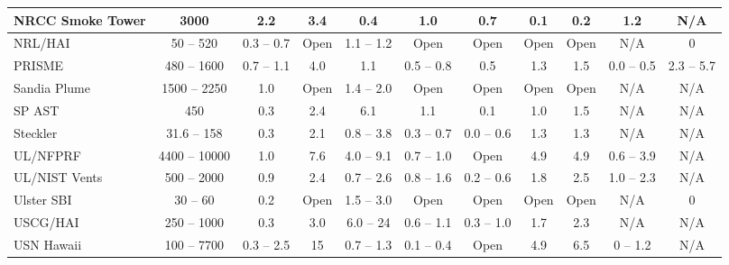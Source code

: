 \begin{landscape}
\begin{longtable}{|l|c|c|c|c|c|c|c|c|c|c|}
NRCC Smoke Tower    & 3000          & 2.2           & 3.4   & 0.4               & 1.0                 & 0.7           & 0.1         & 0.2         & 1.2                   & N/A                   \\ \hline
NRL/HAI             & 50 -- 520     & 0.3 -- 0.7    & Open  & 1.1 -- 1.2        & Open                & Open          & Open        & Open        & N/A                   & 0                     \\ \hline
PRISME              & 480 -- 1600   & 0.7 -- 1.1    & 4.0   & 1.1               & 0.5 -- 0.8          & 0.5           & 1.3         & 1.5         & 0.0 -- 0.5            & 2.3 -- 5.7            \\ \hline
Sandia Plume        & 1500 -- 2250  & 1.0           & Open  & 1.4 -- 2.0        & Open                & Open          & Open        & Open        & N/A                   & N/A                   \\ \hline
SP AST              & 450           & 0.3           & 2.4   & 6.1               & 1.1                 & 0.1           & 1.0         & 1.5         & N/A                   & N/A                   \\ \hline
Steckler            & 31.6 -- 158   & 0.3           & 2.1   & 0.8 -- 3.8        & 0.3 -- 0.7          & 0.0 -- 0.6    & 1.3         & 1.3         & N/A                   & N/A                   \\ \hline
UL/NFPRF            & 4400 -- 10000 & 1.0           & 7.6   & 4.0 -- 9.1        & 0.7 -- 1.0          & Open          & 4.9         & 4.9         & 0.6 -- 3.9            & N/A                   \\ \hline
UL/NIST Vents       & 500 -- 2000   & 0.9           & 2.4   & 0.7 -- 2.6        & 0.8 -- 1.6          & 0.2 -- 0.6    & 1.8         & 2.5         & 1.0 -- 2.3            & N/A                   \\ \hline
Ulster SBI          & 30 -- 60      & 0.2           & Open  & 1.5 -- 3.0        & Open                & Open          & Open        & Open        & N/A                   & 0                     \\ \hline
USCG/HAI            & 250 -- 1000   & 0.3           & 3.0   & 6.0 -- 24         & 0.6 -- 1.1          & 0.3 -- 1.0    & 1.7         & 2.3         & N/A                   & N/A                   \\ \hline
USN Hawaii          & 100 -- 7700   & 0.3 -- 2.5    & 15    & 0.7 -- 1.3        & 0.1 -- 0.4          & Open          & 4.9         & 6.5         & 0 -- 1.2              & N/A                   \\ \hline

\end{longtable}
\end{landscape}
